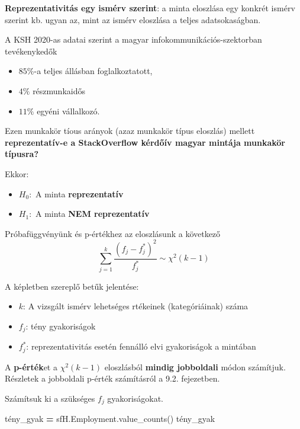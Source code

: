 \documentclass[
]{book}
\newenvironment{Shaded}{\begin{snugshade}}{\end{snugshade}}
\newcommand{\NormalTok}[1]{#1}
\newcommand{\OperatorTok}[1]{\textcolor[rgb]{0.81,0.36,0.00}{\textbf{#1}}}
\providecommand{\tightlist}{%
  \setlength{\itemsep}{0pt}\setlength{\parskip}{0pt}}
\begin{document}
\textbf{Reprezentativitás egy ismérv szerint}: a minta eloszlása egy konkrét ismérv szerint kb. ugyan az, mint az ismérv eloszlása a teljes adatsokaságban.

A KSH 2020-as adatai szerint a magyar infokommunikációs-szektorban tevékenykedők

\begin{itemize}
\tightlist
\item
  \(85\%\)-a teljes állásban foglalkoztatott,
\item
  \(4\%\) részmunkaidős
\item
  \(11\%\) egyéni vállalkozó.
\end{itemize}

Ezen munkakör tíous arányok (azaz munkakör típus eloszlás) mellett \textbf{reprezentatív-e a StackOverflow kérdőív magyar mintája munkakör típusra?}

Ekkor:

\begin{itemize}
\tightlist
\item
  \(H_0:\) A minta \textbf{reprezentatív}
\item
  \(H_1:\) A minta \textbf{NEM reprezentatív}
\end{itemize}

Próbafüggvényünk és p-értékhez az eloszlásunk a következő \[\sum_{j=1}^{k}{\frac{(f_j-f^*_j)^2}{f^*_j}} \sim \chi^2(k-1)\]

A képletben szereplő betűk jelentése:

\begin{itemize}
\tightlist
\item
  \(k\): A vizsgált ismérv lehetséges rtékeinek (kategóriáinak) száma
\item
  \(f_j\): tény gyakoriságok
\item
  \(f^*_j\): reprezentativitás esetén fennálló elvi gyakoriságok a mintában
\end{itemize}

A \textbf{p-érték}et a \(\chi^2(k-1)\) eloszlásból \textbf{mindig jobboldali} módon számítjuk. Részletek a jobboldali p-érték számításról a 9.2. fejezetben.

Számítsuk ki a szükséges \(f_j\) gyakoriságokat.

\begin{Shaded}
\begin{Highlighting}[]
\NormalTok{tény\_gyak }\OperatorTok{=}\NormalTok{ sfH.Employment.value\_counts()}
\NormalTok{tény\_gyak}
\end{Highlighting}
\end{Shaded}
\end{document}
